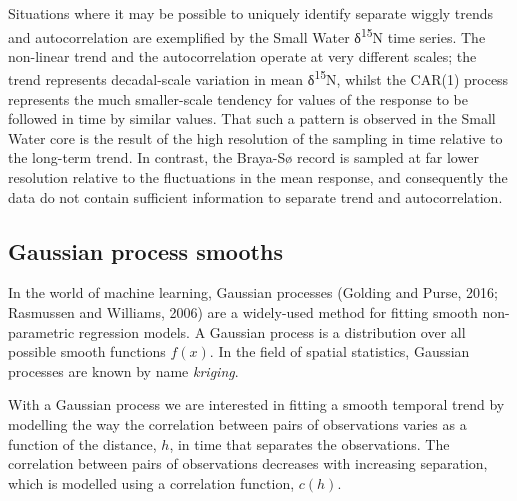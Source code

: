 \documentclass[12pt,]{article}
\begin{document}
Situations where it may be possible to uniquely identify separate wiggly
trends and autocorrelation are exemplified by the Small Water
δ\textsuperscript{15}N time series. The non-linear trend and the
autocorrelation operate at very different scales; the trend represents
decadal-scale variation in mean δ\textsuperscript{15}N, whilst the
CAR(1) process represents the much smaller-scale tendency for values of
the response to be followed in time by similar values. That such a
pattern is observed in the Small Water core is the result of the high
resolution of the sampling in time relative to the long-term trend. In
contrast, the Braya-Sø record is sampled at far lower resolution
relative to the fluctuations in the mean response, and consequently the
data do not contain sufficient information to separate trend and
autocorrelation.

\subsection{Gaussian process smooths}\label{gaussian-process-smooths}

In the world of machine learning, Gaussian processes (Golding and Purse,
2016; Rasmussen and Williams, 2006) are a widely-used method for fitting
smooth non-parametric regression models. A Gaussian process is a
distribution over all possible smooth functions \(f(x)\). In the field
of spatial statistics, Gaussian processes are known by name
\emph{kriging}.

With a Gaussian process we are interested in fitting a smooth temporal
trend by modelling the way the correlation between pairs of observations
varies as a function of the distance, \(h\), in time that separates the
observations. The correlation between pairs of observations decreases
with increasing separation, which is modelled using a correlation
function, \(c(h)\).
\end{document}
